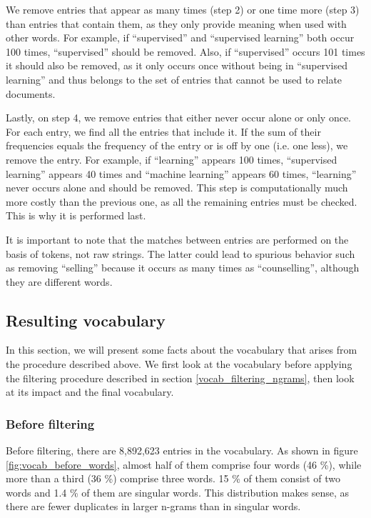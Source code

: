 We remove entries that appear as many times (step 2) or one time more (step 3) than entries that contain them, as they only provide meaning when used with other words. For example, if ``supervised'' and ``supervised learning'' both occur 100 times, ``supervised'' should be removed. Also, if ``supervised'' occurs 101 times it should also be removed, as it only occurs once without being in ``supervised learning'' and thus belongs to the set of entries that cannot be used to relate documents.

Lastly, on step 4, we remove entries that either never occur alone or only once. For each entry, we find all the entries that include it. If the sum of their frequencies equals the frequency of the entry or is off by one (i.e. one less), we remove the entry. For example, if ``learning'' appears 100 times, ``supervised learning'' appears 40 times and ``machine learning'' appears 60 times, ``learning'' never occurs alone and should be removed. This step is computationally much more costly than the previous one, as all the remaining entries must be checked. This is why it is performed last.

It is important to note that the matches between entries are performed on the basis of tokens, not raw strings. The latter could lead to spurious behavior such as removing ``selling'' because it occurs as many times as ``counselling'', although they are different words.

\subsection{Resulting vocabulary}

In this section, we will present some facts about the vocabulary that arises from the procedure described above. We first look at the vocabulary before applying the filtering procedure described in section \ref{vocab_filtering_ngrams}, then look at its impact and the final vocabulary.

\subsubsection{Before filtering}

Before filtering, there are 8,892,623 entries in the vocabulary. As shown in figure \ref{fig:vocab_before_words}, almost half of them comprise four words (46 \%), while more than a third (36 \%) comprise three words. 15 \% of them consist of two words and 1.4 \% of them are singular words. This distribution makes sense, as there are fewer duplicates in larger n-grams than in singular words.


